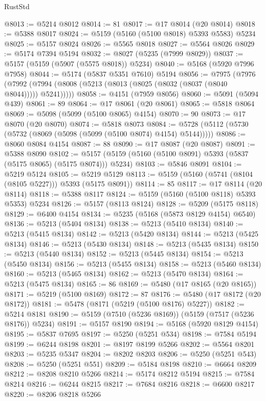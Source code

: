 \begin{lexlean}{RustStd}
\begin{coremodule}
@8013 := @5214 @8012
@8014 := 81
@8017 := @17 @8014 (@20 @8014)
@8018 := @5388 @8017
@8024 := @5159 (@5160 (@5100 @8018) @5393 @5583) @5234
@8025 := @5157 @8024
@8026 := @5565 @8018
@8027 := @5564 @8026
@8029 := @5174 @7394 @5194
@8032 := @8027 (@5235 (@7999 @8029))
@8037 := @5157 (@5159 (@5907 (@5575 @8018)) @5234)
@8040 := @5168 (@5920 @7996 @7958)
@8044 := @5174 (@5837 @5351 @7610) @5194
@8056 := @7975
    (@7976 (@7992 (@7994 (@8008 (@5213 (@8013 (@8025 (@8032 (@8037 (@8040 @8044))))) @5241)))))
@8058 := @4151 (@7959 @8056)
@8060 := @5091 (@5094 @439)
@8061 := 89
@8064 := @17 @8061 (@20 @8061)
@8065 := @5818 @8064
@8069 := @5098 (@5099 (@5100 @8065) @4154)
@8070 := 90
@8073 := @17 @8070 (@20 @8070)
@8074 := @5818 @8073
@8084 := @5728 (@5112 (@5730 (@5732 (@8069 (@5098 (@5099 (@5100 @8074) @4154) @5144)))))
@8086 := @8060 @8084 @4154
@8087 := 88
@8090 := @17 @8087 (@20 @8087)
@8091 := @5388 @8090
@8102 := @5157 (@5159 (@5160 (@5100 @8091) @5393 (@5837 (@5175 @8065) (@5175 @8074))) @5234)
@8103 := @5846 @8091
@8104 := @5219 @5124
@8105 := @5219 @5129
@8113 := @5159 (@5160 (@5741 (@8104 (@8105 @5227))) @5393 (@5175 @8091))
@8114 := 85
@8117 := @17 @8114 (@20 @8114)
@8118 := @5388 @8117
@8124 := @5159 (@5160 (@5100 @8118) @5393 @5353) @5234
@8126 := @5157 (@8113 @8124)
@8128 := @5209 (@5175 @8118)
@8129 := @6400 @4154
@8134 := @5235 (@5168 (@5873 @8129 @4154) @6540)
@8136 := @5213 (@5404 @8134)
@8138 := @5213 (@5410 @8134)
@8140 := @5213 (@5415 @8134)
@8142 := @5213 (@5420 @8134)
@8144 := @5213 (@5425 @8134)
@8146 := @5213 (@5430 @8134)
@8148 := @5213 (@5435 @8134)
@8150 := @5213 (@5440 @8134)
@8152 := @5213 (@5445 @8134)
@8154 := @5213 (@5450 @8134)
@8156 := @5213 (@5455 @8134)
@8158 := @5213 (@5460 @8134)
@8160 := @5213 (@5465 @8134)
@8162 := @5213 (@5470 @8134)
@8164 := @5213 (@5475 @8134)
@8165 := 86
@8169 := @5480 (@17 @8165 (@20 @8165))
@8171 := @5219 (@5100 @8169)
@8172 := 87
@8176 := @5480 (@17 @8172 (@20 @8172))
@8181 := @5478 (@8171 (@5219 (@5100 @8176) @5227))
@8182 := @5214 @8181
@8190 := @5159 (@7510 (@5236 @8169)) (@5159 (@7517 (@5236 @8176)) @5234)
@8191 := @5157 @8190
@8194 := @5168 (@5920 @8129 @4154)
@8195 := @5837 @7695
@8197 := @5250 (@5251 @534)
@8198 := @7584 @5194
@8199 := @6244 @8198
@8201 := @8197 @8199 @5266
@8202 := @5564 @8201
@8203 := @5235 @5347
@8204 := @8202 @8203
@8206 := @5250 (@5251 @543)
@8208 := @5250 (@5251 @551)
@8209 := @5184 @8198
@8210 := @6664 @8209
@8212 := @8208 @8210 @5266
@8214 := @5174 @8212 @5194
@8215 := @7584 @8214
@8216 := @6244 @8215
@8217 := @7684 @8216
@8218 := @6600 @8217
@8220 := @8206 @8218 @5266

\end{coremodule}
\end{lexlean}
